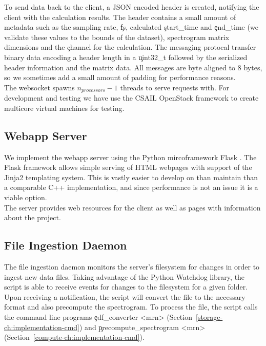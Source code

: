 To send data back to the client, a JSON encoded header is created, notifying
the client with the calculation results. The header contains a small amount of
metadata such as the sampling rate, \c{fs}, calculated \c{start\_time} and
\c{end\_time} (we validate these values to the bounds of the dataset),
spectrogram matrix dimensions and the \c{channel} for the calculation.  The
messaging protocal transfer binary data encoding a header length in a
\c{uint32\_t} followed by the serialized header information and the matrix
data. All messages are byte aligned to 8 bytes, so we sometimes add a small
amount of padding for performance reasons. \\

The websocket spawns $n_{processors} - 1$ threads to serve requests with. For
development and testing we have use the CSAIL OpenStack framework to create
multicore virtual machines for testing.

\subsection{Webapp Server}\label{compute-ch:implementation-webapp}

We implement the webapp server using the Python mircoframework Flask
\cite{flask}. The Flask framework allows simple serving of HTML webpages with
support of the Jinja2 \cite{jinja2} templating system. This is vastly easier to
develop on than maintain than a comparable C++ implementation, and since
performance is not an issue it is a viable option. \\

The server provides web resources for the client as well as pages with
information about the project.

\subsection{File Ingestion Daemon}

The file ingestion daemon monitors the server's filesystem for changes in order
to ingest new data files. Taking advantage of the Python Watchdog
\cite{watchdog} library, the script is able to receive events for changes to
the filesystem for a given folder. Upon receiving a notification, the script
will convert the file to the necessary format and also precompute the
spectrogram. To process the file, the script calls the command line programs
\c{edf\_converter <mrn>} (Section~\ref{storage-ch:implementation-cmd}) and
\c{precompute\_spectrogram <mrn>}
(Section~\ref{compute-ch:implementation-cmd}). \\

